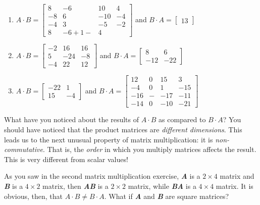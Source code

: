 \begin{Answer}[ref = mult_mat2]
\begin{enumerate}
\item $\mathbf{\mathit{A}} \cdot \mathbf{\mathit{B}} = \begin{bmatrix}
8 & -6 & 10 & 4\\
-8 & 6 & -10 & -4\\
-4 & 3 & -5 & -2\\
8 & -6 + 1- & 4
\end{bmatrix}$ and $\mathbf{\mathit{B}} \cdot \mathbf{\mathit{A}} =
\begin{bmatrix}
13
\end{bmatrix}$
\item $\mathbf{\mathit{A}} \cdot \mathbf{\mathit{B}} = \begin{bmatrix}
-2 & 16 & 16\\
5 & -24 & -8\\
-4 & 22 & 12
\end{bmatrix}$ and $\mathbf{\mathit{B}} \cdot \mathbf{\mathit{A}} =
\begin{bmatrix}
8 & 6\\
-12 & -22
\end{bmatrix}$
\item $\mathbf{\mathit{A}} \cdot \mathbf{\mathit{B}} = \begin{bmatrix}
-22 & 1\\
15 & -4
\end{bmatrix}$ and $\mathbf{\mathit{B}} \cdot \mathbf{\mathit{A}} =
\begin{bmatrix}
12 & 0 & 15 & 3\\
-4 & 0 & 1 & -15\\
-16 & - & -17 & -11\\
-14 & 0 & -10 & -21
\end{bmatrix}$
\end{enumerate}
\end{Answer}

What have you noticed about the results of $\mathbf{\mathit{A}} \cdot
\mathbf{\mathit{B}}$ as compared to $\mathbf{\mathit{B}} \cdot \mathbf{
\mathit{A}}$? You should have noticed that the product matrices are
\textit{different dimensions}. This leads us to the next unusual property of
matrix multiplication: it is \textit{non-commutative}. That is, the \textit{
order} in which you multiply matrices affects the result. This is very
different from scalar values!

As you saw in the second matrix multiplication exercise, \textbf{\textit{A}}
is a $2 \times 4$ matrix and \textbf{\textit{B}} is a $4 \times 2$ matrix,
then \textbf{\textit{A}}\textbf{\textit{B}} is a $2 \times 2$ matrix, while
\textbf{\textit{B}}\textbf{\textit{A}} is a $4 \times 4$ matrix. It is obvious,
then, that $\mathbf{\mathit{A}} \cdot \mathbf{\mathit{B}} \neq \mathbf{\mathit{
B}} \cdot \mathbf{\mathit{A}}$. What if \textbf{\textit{A}} and \textbf{\textit{
B}} are square matrices?

